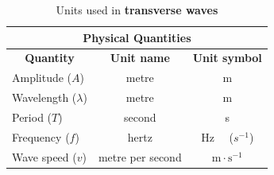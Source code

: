 
\begin{table}[H]
\begin{center}
\begin{tabular}{|l|c|c|}\hline \hline 
\multicolumn{3}{|c|}{\textbf{Physical Quantities}}\\ \hline \hline
\multicolumn{1}{|c|}{\textbf{Quantity}} & \textbf{Unit name} & \textbf{Unit symbol}\\ \hline
Amplitude ($A$) & metre & m \\ \hline
Wavelength ($\lambda$) & metre & m \\ \hline
Period ($T$) & second & s \\ \hline
Frequency ($f$) & hertz & Hz \ \ ($s^{-1}$) \\ \hline
Wave speed ($v$) & metre per second & $\text{m} \cdot \text{s}^{-1}$ \\ \hline
\end{tabular}
\end{center}
\caption{Units used in \textbf{transverse waves} }
\label{table:electrostatics::units}
\end{table}






